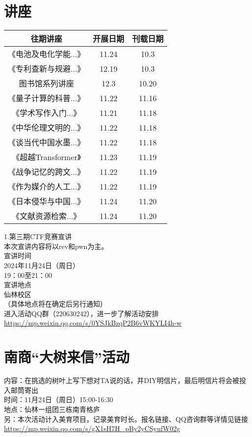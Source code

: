 \documentclass[letterpaper, 12pt]{article}
\begin{document}
\begin{multicols}{2}

\section{讲座}
\begin{tabular}{|c|c|c|}
    \hline
    往期讲座 & 开展日期 & 刊载日期\\
    \hline\hline
    《电池及电化学能...》 & 11.24 & 10.3\\
    《专利查新与规避...》 & 12.19 & 10.3\\
    图书馆系列讲座 & 12.3 & 10.20\\
    《量子计算的科普...》 & 11.22 & 11.16\\
    《学术写作入门...》& 11.21 & 11.18\\
    《中华伦理文明的...》& 11.22 & 11.18\\
    《谈当代中国水墨...》& 11.22 & 11.18\\
    《超越Transformer》 & 11.23 & 11.19\\
    《战争记忆的跨文...》 & 11.22 & 11.19\\
    《作为媒介的人工...》 & 11.22 & 11.19\\
    《日本侵华与中国...》 & 11.24 & 11.20\\
    《文献资源检索...》 & 11.24 & 11.20\\
    \hline
\end{tabular}

1.第三期CTF竞赛宣讲\\
本次宣讲内容将以rev和pwn为主。\\
宣讲时间\\
2024年11月24日（周日）\\
19：00至21：00\\
宣讲地点\\
仙林校区\\
（具体地点将在确定后另行通知）\\
进入活动QQ群（220630242），进一步了解活动安排\\
\url{https://mp.weixin.qq.com/s/0YSJkBzqP2B6vWKYLI4h-w}\\




\section{南商“大树来信”活动}
内容：在挑选的树叶上写下想对TA说的话，并DIY明信片，最后明信片将会被投入邮筒寄出\\
时间：11月24日（周日）15:00-16:30\\
地点：仙林一组团三栋南青格庐\\
另：本次活动计入美育项目，记录美育时长。报名链接、QQ咨询群等详情见链接\url{https://mp.weixin.qq.com/s/gX1sH7H_pBy2yCSyufW02g}

\end{multicols}
\end{document}
